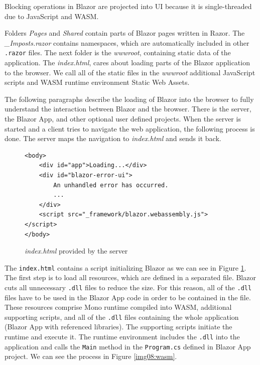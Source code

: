 Blocking operations in Blazor are projected into UI because it is single-threaded due to JavaScript and WASM.
\par
Folders \textit{Pages} and \textit{Shared} contain parts of Blazor pages written in Razor.
The \textit{\_Imposts.razor} contains namespaces, which are automatically included in other \texttt{.razor} files.
The next folder is the \textit{wwwroot}, containing static data of the application.
The \textit{index.html}, cares about loading parts of the Blazor application to the browser.
We call all of the static files in the \textit{wwwroot} additional JavaScript scripts and WASM runtime environment Static Web Assets.
\par
The following paragraphs describe the loading of Blazor into the browser to fully understand the interaction between Blazor and the browser.
There is the server, the Blazor App, and other optional user defined projects. 
When the server is started and a client tries to navigate the web application, the following process is done.
The server maps the navigation to \textit{index.html} and sends it back.
\par
\begin{figure}[b!]
\begin{lstlisting}
<body>
    <div id="app">Loading...</div>
    <div id="blazor-error-ui">
        An unhandled error has occurred.
		...
    </div>
    <script src="_framework/blazor.webassembly.js"></script>
</body>

\end{lstlisting}
\caption{\textit{index.html} provided by the server}
\label{img07:index}
\end{figure}
\par 
The \texttt{index.html} contains a script initializing Blazor as we can see in Figure \ref{img07:index}.
The first step is to load all resources, which are defined in a separated file.
Blazor cuts all unnecessary \texttt{.dll} files to reduce the size.
For this reason, all of the \texttt{.dll} files have to be used in the Blazor App code in order to be contained in the file. 
These resources comprise Mono runtime compiled into WASM, additional supporting scripts, and all of the \texttt{.dll} files containing the whole application (Blazor App with referenced libraries).
The supporting scripts initiate the runtime and execute it.
The runtime environment includes the \texttt{.dll} into the application and calls the \texttt{Main} method in the \texttt{Program.cs} defined in Blazor App project.
We can see the process in Figure \ref{img08:wasm}.
